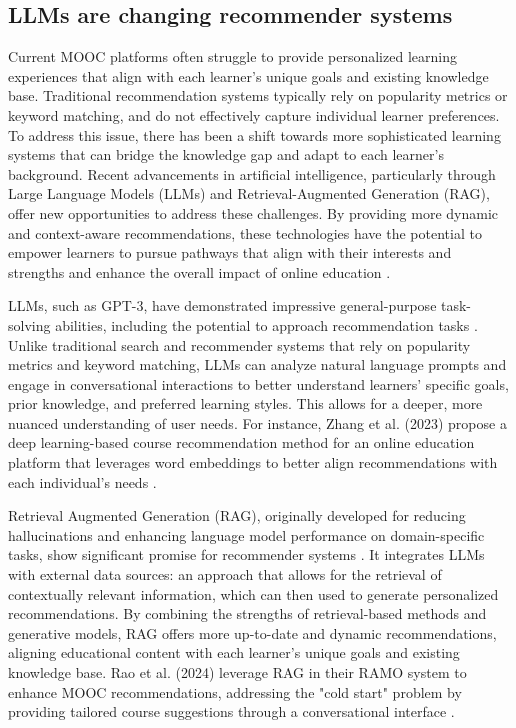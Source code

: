 \subsection{LLMs are changing recommender systems}

Current MOOC platforms often struggle to provide personalized learning experiences that align with each learner's unique goals and existing knowledge base. Traditional recommendation systems typically rely on popularity metrics or keyword matching, and do not effectively capture individual learner preferences. To address this issue, there has been a shift towards more sophisticated learning systems that can bridge the knowledge gap and adapt to each learner’s background. Recent advancements in artificial intelligence, particularly through Large Language Models (LLMs) and Retrieval-Augmented Generation (RAG), offer new opportunities to address these challenges. By providing more dynamic and context-aware recommendations, these technologies have the potential to empower learners to pursue pathways that align with their interests and strengths and enhance the overall impact of online education \cite{khalid_recommender_2020}. 

LLMs, such as GPT-3, have demonstrated impressive general-purpose task-solving abilities, including the potential to approach recommendation tasks \cite{noauthor_language_nodate}. Unlike traditional search and recommender systems that rely on popularity metrics and keyword matching, LLMs can analyze natural language prompts and engage in conversational interactions to better understand learners’ specific goals, prior knowledge, and preferred learning styles. This allows for a deeper, more nuanced understanding of user needs. For instance, Zhang et al. (2023) propose a deep learning-based course recommendation method for an online education platform that leverages word embeddings to better align recommendations with each individual’s needs \cite{zhang_personalized_2023}. 

Retrieval Augmented Generation (RAG), originally developed for reducing hallucinations and enhancing language model performance on domain-specific tasks, show significant promise for recommender systems \cite{noauthor_retrieval-augmented_nodate}. It integrates LLMs with external data sources: an approach that allows for the retrieval of contextually relevant information, which can then used to generate personalized recommendations. By combining the strengths of retrieval-based methods and generative models, RAG offers more up-to-date and dynamic recommendations, aligning educational content with each learner's unique goals and existing knowledge base. Rao et al. (2024) leverage RAG in their RAMO system to enhance MOOC recommendations, addressing the "cold start" problem by providing tailored course suggestions through a conversational interface \cite{rao_ramo_2024}.


